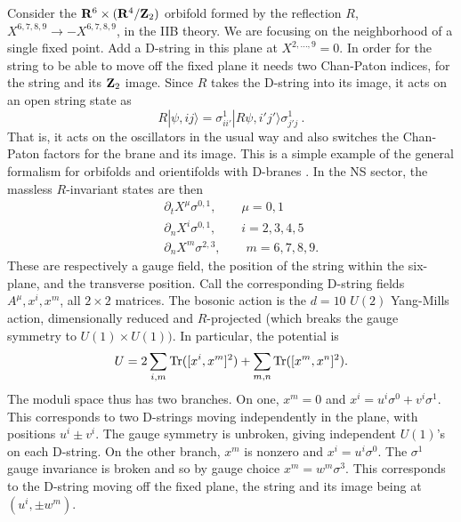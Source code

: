 \documentclass[12pt]{article}
\def\be{\begin{equation}}
\def\ee{\end{equation}}
\def\Z{{\bf Z}}
\def\R{{\bf R}}
\begin{document}
Consider the $\R^6 \times (\R^4/\Z_2)$ orbifold formed by the reflection $R$,
$X^{6,7,8,9} \to -X^{6,7,8,9}$, in the IIB theory.  We are focusing
on the neighborhood of a single fixed point.  Add a D-string in this plane at
$X^{2,\ldots,9} = 0$.  In order for the string to be able to move off the fixed
plane it needs two Chan-Paton indices, for the string and its $\Z_2$ image. 
Since $R$ takes the D-string into its image, it acts on an open string state as
\be
R |{\psi,ij}\rangle = \sigma^1_{ii'} |{R\psi,i'j'}\rangle \sigma^1_{j'j}\ .
\ee
That is, it acts on the oscillators in the usual way and also switches the
Chan-Paton factors for the brane and its image.  This is a simple example of
the general formalism for orbifolds and orientifolds with D-branes \cite{GP}.
In the NS sector, the massless $R$-invariant states are then
\begin{eqnarray}
&&\partial_t X^\mu \sigma^{0,1}, \qquad \mu = 0,1 \nonumber\\
&&\partial_n X^i \sigma^{0,1}, \qquad i = 2,3,4,5 \nonumber\\ 
&&\partial_n X^m \sigma^{2,3}, \qquad m = 6,7,8,9.
\end{eqnarray}
These are respectively a gauge field, the position of the string within
the six-plane, and the transverse position.  Call the corresponding
D-string fields $A^\mu, x^i, x^m$, all $2\times2$ matrices.  The
bosonic action is the $d = 10$ $U(2)$ Yang-Mills action, dimensionally
reduced and $R$-projected (which breaks the gauge symmetry to $U(1)
\times U(1))$.  In particular, the potential is
\be
U = 2\sum_{i,m} {\rm Tr}([x^i,x^m]^2) + \sum_{m,n} {\rm
Tr}([x^m,x^n]^2). \label{dppot}
\ee
The moduli space thus has two branches.  On one, $x^m = 0$ and $x^i =
u^i \sigma^0 + v^i \sigma^1$.  This corresponds to two D-strings moving
independently in the plane, with positions $u^i \pm v^i$.  The gauge
symmetry is unbroken, giving independent $U(1)$'s on each
D-string.
On the other branch, $x^m$ is nonzero and $x^i = u^i
\sigma^0$.  The $\sigma^1$ gauge invariance is broken and so by gauge
choice $x^m = w^m \sigma^3$.  This corresponds to the D-string moving
off the fixed plane, the string and its image being at
$(u^i, \pm w^m)$.
\end{document}
